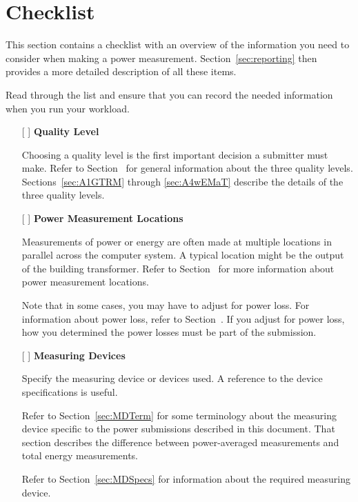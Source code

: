 \chapter{Checklist}
\label{sec:checklist}

This section contains a checklist with an overview of the information you need to consider when making a power measurement.
Section~\ref{sec:reporting} then provides a more detailed description of all these items.

Read through the list and ensure that you can record the needed 
information when you run your workload.

\begin{itemize}
\item[{[ ]}]
\textbf{Quality Level}

Choosing a quality level is the first important decision a submitter must make.
Refer to Section~ for general information about the three quality levels.
Sections~\ref{sec:A1GTRM} through \ref{sec:A4wEMaT} describe the details of the three quality levels.

\item[{[ ]}]
\textbf{Power Measurement Locations}

Measurements of power or energy are often made at multiple locations in parallel across the computer system.
A typical location might be the output of the building transformer.
Refer to Section~ for more information about power measurement locations.

Note that in some cases, you may have to adjust for power loss.
For information about power loss, refer to Section~.
If you adjust for power loss, how you determined the power losses must be part of the submission.


\item[{[ ]}]
\textbf{Measuring Devices}

Specify the measuring device or devices used.
A reference to the device specifications is useful.

Refer to Section~\ref{sec:MDTerm} for some terminology about the measuring device specific to the power submissions described in this document.
That section describes the difference between power-averaged measurements and total energy measurements.

Refer to Section~\ref{sec:MDSpecs} for information about the required measuring device.


\end{itemize}
